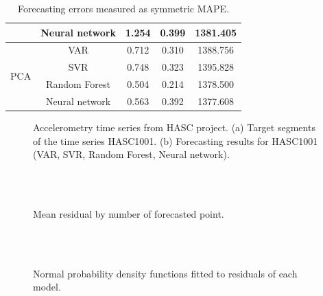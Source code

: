 \documentclass[conference]{IEEEtran}
\begin{document}
\begin{table}
\begin{tabular}{|c|c|c|c|c|}
\cline{2-5}
 &Neural network &   1.254 &    0.399 &    1381.405\\
\cline{2-5}
\hline
\multirow{4}{*}{PCA} &VAR &   0.712 &    0.310 &    1388.756\\
\cline{2-5}
 &SVR &   0.748 &    0.323 &    1395.828\\
\cline{2-5}
 &Random Forest &   0.504 &    0.214 &    1378.500\\
\cline{2-5}
 &Neural network &   0.563 &    0.392 &    1377.608\\
\cline{2-5}
\hline
\end{tabular}
\caption{Forecasting errors measured as symmetric MAPE.}
\label{fg:feature_selection_res_HASC1}
\end{table}


\begin{figure}
\centering
\caption{Accelerometry time series from HASC project.
(a) Target segments of the time series HASC1001. (b) Forecasting results for	HASC1001 (VAR, SVR, Random Forest, Neural network).}\label{fg:target_data}
\end{figure}


\begin{figure}
\centering
{}
\\
\\
\caption{Mean residual by number of forecasted point.}
\end{figure}

\begin{figure}
\centering
{}
\\
\\
\caption{Normal probability density functions fitted to residuals of each model.}
\end{figure}
\end{document}
